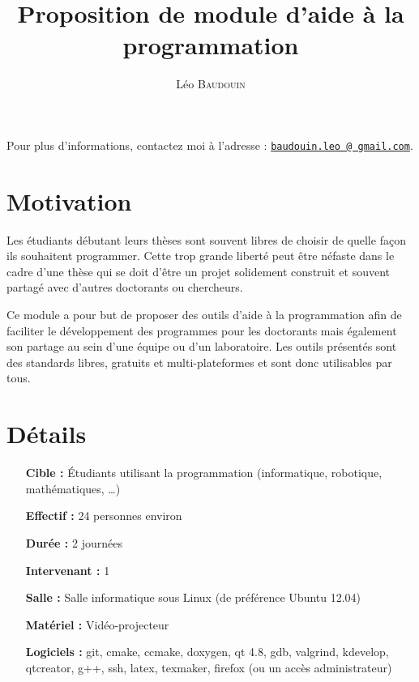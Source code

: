 \documentclass[a4paper,oneside]{article}
\title{\huge Proposition de module d'aide à la programmation}
\author{L\'eo \textsc{Baudouin}}
\begin{document}
\maketitle


\noindent Pour plus d'informations, contactez moi à l'adresse : 
\href{mailto:baudouin.leo@gmail.com}{\nolinkurl{baudouin.leo @ gmail.com}}.


\section{Motivation}

Les étudiants débutant leurs thèses sont souvent libres de choisir de quelle façon ils souhaitent programmer.
Cette trop grande liberté peut être néfaste dans le cadre d'une thèse qui se doit d'être un projet solidement construit et souvent partagé avec d'autres doctorants ou chercheurs.

Ce module a pour but de proposer des outils d'aide à la programmation afin de faciliter le développement des programmes pour les doctorants mais également son partage au sein d'une équipe ou d'un laboratoire.
Les outils présentés sont des standards libres, gratuits et multi-plateformes et sont donc utilisables par tous.

\section{Détails}

\begin{itemize}
\item[\textbf{Cible :}] \'Etudiants utilisant la programmation (informatique, robotique, mathématiques, \dots) 
\item[\textbf{Effectif :}]  24 personnes environ
\item[\textbf{Durée :}]  2 journées
\item[\textbf{Intervenant :}]  1
\item[\textbf{Salle :}] Salle informatique sous Linux (de préférence Ubuntu 12.04)
\item[\textbf{Matériel :}] Vidéo-projecteur
\item[\textbf{Logiciels :}] git, cmake, ccmake, doxygen, qt 4.8, gdb, valgrind, kdevelop, qtcreator, g++, ssh, latex, texmaker, firefox (ou un accès administrateur)
\end{itemize}
\end{document}
